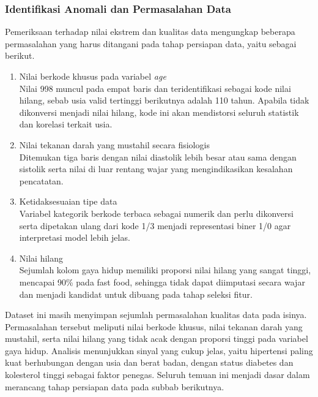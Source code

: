 \subsubsection{Identifikasi Anomali dan Permasalahan Data}
 
Pemeriksaan terhadap nilai ekstrem dan kualitas data mengungkap beberapa permasalahan yang harus ditangani pada tahap persiapan data, yaitu sebagai berikut.
 
\begin{enumerate}
    \item Nilai berkode khusus pada variabel \textit{age} \\
    Nilai 998 muncul pada empat baris dan teridentifikasi sebagai kode nilai hilang, sebab usia valid tertinggi berikutnya adalah 110 tahun. Apabila tidak dikonversi menjadi nilai hilang, kode ini akan mendistorsi seluruh statistik dan korelasi terkait usia.
 
    \item Nilai tekanan darah yang mustahil secara fisiologis \\
    Ditemukan tiga baris dengan nilai diastolik lebih besar atau sama dengan sistolik serta nilai di luar rentang wajar yang mengindikasikan kesalahan pencatatan.
 
    \item Ketidaksesuaian tipe data \\
    Variabel kategorik berkode terbaca sebagai numerik dan perlu dikonversi serta dipetakan ulang dari kode 1/3 menjadi representasi biner 1/0 agar interpretasi model lebih jelas.
 
    \item Nilai hilang \\
    Sejumlah kolom gaya hidup memiliki proporsi nilai hilang yang sangat tinggi, mencapai 90\% pada fast food, sehingga tidak dapat diimputasi secara wajar dan menjadi kandidat untuk dibuang pada tahap seleksi fitur.
\end{enumerate}
 
 
Dataset ini masih menyimpan sejumlah permasalahan kualitas data pada isinya. Permasalahan tersebut meliputi nilai berkode khusus, nilai tekanan darah yang mustahil, serta nilai hilang yang tidak acak dengan proporsi tinggi pada variabel gaya hidup. Analisis menunjukkan sinyal yang cukup jelas, yaitu hipertensi paling kuat berhubungan dengan usia dan berat badan, dengan status diabetes dan kolesterol tinggi sebagai faktor penegas. Seluruh temuan ini menjadi dasar dalam merancang tahap persiapan data pada subbab berikutnya.


